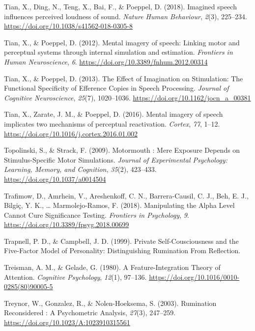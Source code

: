 \documentclass[a4paper,12pt,twoside,onecolumn,openright,final,oldfontcommands]{memoir}
\begin{document}
\leavevmode\hypertarget{ref-tian_imagined_2018}{}%
Tian, X., Ding, N., Teng, X., Bai, F., \& Poeppel, D. (2018). Imagined speech influences perceived loudness of sound. \emph{Nature Human Behaviour}, \emph{2}(3), 225--234. \url{https://doi.org/10.1038/s41562-018-0305-8}

\leavevmode\hypertarget{ref-tian_mental_2012}{}%
Tian, X., \& Poeppel, D. (2012). Mental imagery of speech: Linking motor and perceptual systems through internal simulation and estimation. \emph{Frontiers in Human Neuroscience}, \emph{6}. \url{https://doi.org/10.3389/fnhum.2012.00314}

\leavevmode\hypertarget{ref-tian_effect_2013}{}%
Tian, X., \& Poeppel, D. (2013). The Effect of Imagination on Stimulation: The Functional Specificity of Efference Copies in Speech Processing. \emph{Journal of Cognitive Neuroscience}, \emph{25}(7), 1020--1036. \url{https://doi.org/10.1162/jocn_a_00381}

\leavevmode\hypertarget{ref-tian_mental_2016}{}%
Tian, X., Zarate, J. M., \& Poeppel, D. (2016). Mental imagery of speech implicates two mechanisms of perceptual reactivation. \emph{Cortex}, \emph{77}, 1--12. \url{https://doi.org/10.1016/j.cortex.2016.01.002}

\leavevmode\hypertarget{ref-topolinski_motormouth_2009}{}%
Topolinski, S., \& Strack, F. (2009). Motormouth : Mere Exposure Depends on Stimulus-Specific Motor Simulations. \emph{Journal of Experimental Psychology: Learning, Memory, and Cognition}, \emph{35}(2), 423--433. \url{https://doi.org/10.1037/a0014504}

\leavevmode\hypertarget{ref-trafimow_manipulating_2018}{}%
Trafimow, D., Amrhein, V., Areshenkoff, C. N., Barrera-Causil, C. J., Beh, E. J., Bilgiç, Y. K., \ldots{} Marmolejo-Ramos, F. (2018). Manipulating the Alpha Level Cannot Cure Significance Testing. \emph{Frontiers in Psychology}, \emph{9}. \url{https://doi.org/10.3389/fpsyg.2018.00699}

\leavevmode\hypertarget{ref-trapnell_private_1999}{}%
Trapnell, P. D., \& Campbell, J. D. (1999). Private Self-Cousciousness and the Five-Factor Model of Personality: Distinguishing Rumination From Reflection.

\leavevmode\hypertarget{ref-treisman_feature-integration_1980}{}%
Treisman, A. M., \& Gelade, G. (1980). A Feature-Integration Theory of Attention. \emph{Cognitive Psychology}, \emph{12}(1), 97--136. \url{https://doi.org/10.1016/0010-0285(80)90005-5}

\leavevmode\hypertarget{ref-treynor_rumination_2003}{}%
Treynor, W., Gonzalez, R., \& Nolen-Hoeksema, S. (2003). Rumination Reconsidered : A Psychometric Analysis, \emph{27}(3), 247--259. \url{https://doi.org/10.1023/A:1023910315561}
\end{document}
